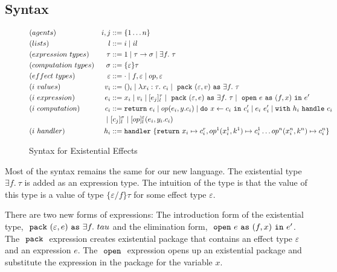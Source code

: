 \subsection{Syntax}
\begin{figure}
\label{fig-syntax}
\begin{align*}
&(agents) &i, j &::= \{1 \dots n\}\\
&(lists) & l &::= i \mid il\\
&(expression\ types) &\tau &::= 1 \mid \tau \rightarrow \sigma \mid \exists f.\ \tau \\
&(computation\ types) &\sigma &::= \{\varepsilon\}\tau\\
&(effect\ types) &\varepsilon &::= \cdot \mid f, \varepsilon \mid op, \varepsilon\\
&(i\ values) &{v_i} &::= ()_i \mid \lambda x_i:\tau.\ c_i \mid \m{pack} (\varepsilon, v) \m{as} \exists f.\ \tau\\
&(i\ expression) &e_i &::= x_i \mid v_i \mid [e_j]^\tau_l \mid \m{pack} (\varepsilon, e) \m{as} \exists f.\ \tau  \mid \m{open} e \m{as} (f, x) \m{in} e'\\
&(i\ computation) &c_i &::= \texttt{return}\ e_i \mid op(e_i, y.c_i) \mid \texttt{do}\ x \leftarrow c_i\ \texttt{in}\ c_i' \mid e_i\ e_i' \mid \texttt{with}\ h_i\ \texttt{handle}\ c_i\\
 &\ &\mid\ &[c_j]^\sigma_l \mid [op]^\varepsilon_l (e_i, y_i.c_i)\\
&(i\ handler) &h_i &::= \texttt{handler}\ \{\texttt{return}\ x_i \mapsto c^r_i, op^1(x_i^1, k^1) \mapsto c_i^1 \dots  op^n(x_i^n, k^n) \mapsto c_i^n\}  
\end{align*}
\caption{Syntax for Existential Effects}
\end{figure}

Most of the syntax remains the same for our new language. The existential type $\exists f.\ \tau$ is added as an expression type. The intuition of the type is that the value of this type is a value of type $\{\varepsilon/f\}\tau$ for some effect type $\varepsilon$. 

There  are two new forms of expressions: The introduction form of the existential type, $\ \texttt{pack}\  (\varepsilon, e) \ \texttt{as}\  \exists f.\ tau$ and the elimination form, $\ \texttt{open}\  e \ \texttt{as}\  (f, x) \ \texttt{in}\  e'$. The $\ \texttt{pack}\ $ expression creates existential package that contains an effect type $\varepsilon$ and an expression $e$.  The $\ \texttt{open}\ $ expression opens up an existential package and substitute the expression in the package for the variable $x$.

